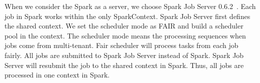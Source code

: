 
When we consider the Spark as a server, we choose Spark Job Server 0.6.2~\cite{www:jobserver}. Each job in Spark works within the only {\ttfamily \small SparkContext}. Spark Job Server first defines the shared context. We set the scheduler mode as FAIR and build a scheduler pool in the context. The scheduler mode means the processing sequences when jobs come from multi-tenant. Fair scheduler will process tasks from each job fairly. All jobs are submitted to Spark Job Server instead of Spark. Spark Job Server will resubmit the job to the shared context in Spark. Thus, all jobs are processed in one context in Spark.